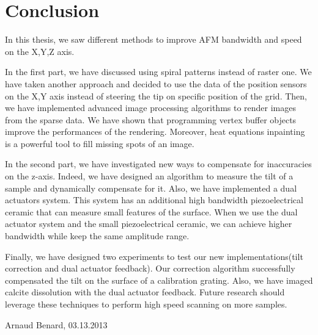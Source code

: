 \chapter{Conclusion}

In this thesis, we saw different methods to improve AFM bandwidth and speed on the X,Y,Z axis. 

In the first part, we have discussed using spiral patterns instead of raster one. We have taken another approach and decided to use the data of the position sensors on the X,Y axis instead of steering the tip on specific position of the grid. Then, we have implemented advanced image processing algorithms to render images from the sparse data. We have shown that programming vertex buffer objects improve the performances of the rendering. Moreover, heat equations inpainting is a powerful tool to fill missing spots of an image.

In the second part, we have investigated new ways to compensate for inaccuracies on the z-axis. Indeed, we have designed an algorithm to measure the tilt of a sample and dynamically compensate for it. Also, we have implemented a dual actuators system. This system has an additional high bandwidth piezoelectrical ceramic that can measure small features of the surface. When we use the dual actuator system and the small piezoelectrical ceramic, we can achieve higher bandwidth while keep the same amplitude range.

Finally, we have designed two experiments to test our new implementations(tilt correction and dual actuator feedback). Our correction algorithm successfully compensated the tilt on the surface of a calibration grating. Also, we have imaged calcite dissolution with the dual actuator feedback. Future research should leverage these techniques to perform high speed scanning on more samples.


\vspace{10 mm}
Arnaud Benard, 03.13.2013